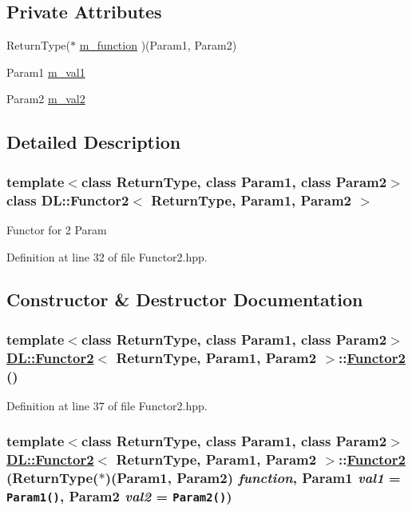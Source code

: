 \subsection*{Private Attributes}
\begin{CompactItemize}
\item 
Return\-Type($\ast$ \hyperlink{classDL_1_1Functor2_r0}{m\_\-function} )(Param1, Param2)
\item 
Param1 \hyperlink{classDL_1_1Functor2_r1}{m\_\-val1}
\item 
Param2 \hyperlink{classDL_1_1Functor2_r2}{m\_\-val2}
\end{CompactItemize}


\subsection{Detailed Description}
\subsubsection*{template$<$class Return\-Type, class Param1, class Param2$>$ class DL::Functor2$<$ Return\-Type, Param1, Param2 $>$}

Functor for 2 Param



Definition at line 32 of file Functor2.hpp.

\subsection{Constructor \& Destructor Documentation}
\hypertarget{classDL_1_1Functor2_d0}{
\subsubsection[Functor2]{\setlength{\rightskip}{0pt plus 5cm}template$<$class Return\-Type, class Param1, class Param2$>$ \hyperlink{classDL_1_1Functor2}{DL::Functor2}$<$ Return\-Type, Param1, Param2 $>$::\hyperlink{classDL_1_1Functor2}{Functor2} ()}}
\label{classDL_1_1Functor2_d0}




Definition at line 37 of file Functor2.hpp.\hypertarget{classDL_1_1Functor2_a0}{
\subsubsection[Functor2]{\setlength{\rightskip}{0pt plus 5cm}template$<$class Return\-Type, class Param1, class Param2$>$ \hyperlink{classDL_1_1Functor2}{DL::Functor2}$<$ Return\-Type, Param1, Param2 $>$::\hyperlink{classDL_1_1Functor2}{Functor2} (Return\-Type($\ast$)(Param1, Param2) {\em function}, Param1 {\em val1} = {\tt Param1()}, Param2 {\em val2} = {\tt Param2()})}}
\label{classDL_1_1Functor2_a0}




